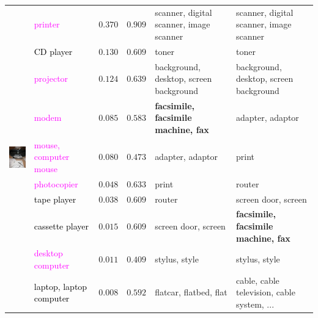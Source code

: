 \documentclass[11pt,letterpaper]{article}
\begin{document}
\begin{table}[t]
\begin{center}
\begin{small}
{\begin{tabular}{clrrll}
\multirow{10}{*}{\includegraphics[height=10em]{n03316105_29720.JPEG}}
& \textcolor{magenta}{printer} & $0.370$& $0.909$& scanner, digital scanner, image scanner& scanner, digital scanner, image scanner \\
& \textcolor{black}{CD player} & $0.130$& $0.609$& toner& toner \\
& \textcolor{magenta}{projector} & $0.124$& $0.639$& background, desktop, screen background& background, desktop, screen background \\
& \textcolor{magenta}{modem} & $0.085$& $0.583$& \textbf{facsimile, facsimile machine, fax}& adapter, adaptor \\
& \textcolor{magenta}{mouse, computer mouse} & $0.080$& $0.473$& adapter, adaptor& print \\
& \textcolor{magenta}{photocopier} & $0.048$& $0.633$& print& router \\
& \textcolor{black}{tape player} & $0.038$& $0.609$& router& screen door, screen \\
& \textcolor{black}{cassette player} & $0.015$& $0.609$& screen door, screen& \textbf{facsimile, facsimile machine, fax} \\
& \textcolor{magenta}{desktop computer} & $0.011$& $0.409$& stylus, style& stylus, style \\
& \textcolor{black}{laptop, laptop computer} & $0.008$& $0.592$& flatcar, flatbed, flat& cable, cable television, cable system, ...\\


\bottomrule
\end{tabular}}
\end{small}
\end{center}
\end{table}
\end{document}
